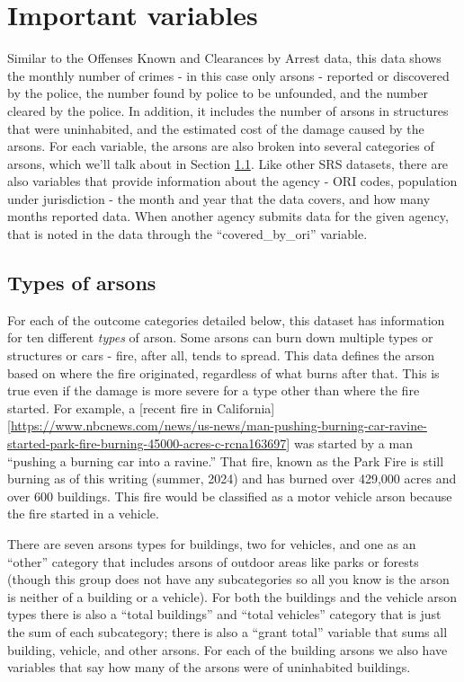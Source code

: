 \documentclass[
]{krantz}
\begin{document}
\section{Important variables}\label{important-variables-5}

Similar to the Offenses Known and Clearances by Arrest data,
this data shows the monthly number of crimes - in this case
only arsons - reported or discovered by the police, the
number found by police to be unfounded, and the number
cleared by the police. In addition, it includes the number
of arsons in structures that were uninhabited, and the
estimated cost of the damage caused by the arsons. For each
variable, the arsons are also broken into several categories
of arsons, which we'll talk about in Section
\ref{arsonType}. Like other SRS datasets, there are also
variables that provide information about the agency - ORI
codes, population under jurisdiction - the month and year
that the data covers, and how many months reported data.
When another agency submits data for the given agency, that
is noted in the data through the ``covered\_by\_ori''
variable.

\subsection{Types of arsons}\label{arsonType}

For each of the outcome categories detailed below, this
dataset has information for ten different \emph{types} of
arson. Some arsons can burn down multiple types or
structures or cars - fire, after all, tends to spread. This
data defines the arson based on where the fire originated,
regardless of what burns after that. This is true even if
the damage is more severe for a type other than where the
fire started. For example, a {[}recent fire in
California{]}{[}\url{https://www.nbcnews.com/news/us-news/man-pushing-burning-car-ravine-started-park-fire-burning-45000-acres-c-rcna163697}{]}
was started by a man ``pushing a burning car into a
ravine.'' That fire, known as the Park Fire is still burning
as of this writing (summer, 2024) and has burned over
429,000 acres and over 600 buildings. This fire would be
classified as a motor vehicle arson because the fire started
in a vehicle.

There are seven arsons types for buildings, two for
vehicles, and one as an ``other'' category that includes
arsons of outdoor areas like parks or forests (though this
group does not have any subcategories so all you know is the
arson is neither of a building or a vehicle). For both the
buildings and the vehicle arson types there is also a
``total buildings'' and ``total vehicles'' category that is
just the sum of each subcategory; there is also a ``grant
total'' variable that sums all building, vehicle, and other
arsons. For each of the building arsons we also have
variables that say how many of the arsons were of
uninhabited buildings.
\end{document}
